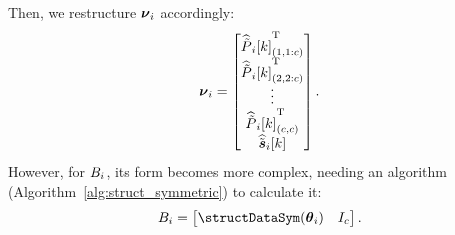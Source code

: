 \documentclass[../main.tex]{subfiles}
\begin{document}
Then, we restructure ${\boldsymbol{\nu}_{i}}$ accordingly:
\begin{equation}
  \rlsparam=\left[
    \begin{matrix}
      \elem[1,1:c]{\Plintildeestimate}\T\\
      \elem[2,2:c]{\Plintildeestimate}\T\\
      \vdots\\
      \elem[c,c]{\Plintildeestimate}\T\\
      \siktildeestimate\\
    \end{matrix}
  \right].
\end{equation}
However, for ${B_i}$, its form becomes more complex, needing an algorithm (Algorithm~\ref{alg:struct_symmetric}) to calculate it:
\begin{equation}
  \rlssysinput=\left[
    \begin{matrix}
      \text{\structDataSym}(\thetai) &  I_{c}
    \end{matrix}
  \right].
\end{equation}
\end{document}
